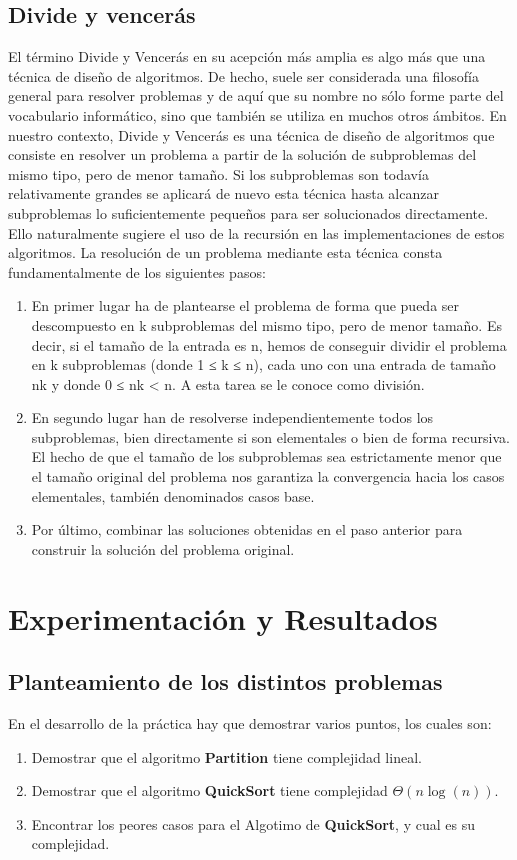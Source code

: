 \documentclass[12pt,twoside]{article}
\begin{document}
\subsection{\textbf{Divide y vencerás}}
\setlength{\parindent}{1.5em}El término Divide y Vencerás en su acepción más amplia es algo más que una técnica de diseño de algoritmos. De hecho, suele ser considerada una filosofía general para resolver problemas y de aquí que su nombre no sólo forme parte del vocabulario informático, sino que también se utiliza en muchos otros ámbitos.
En nuestro contexto, Divide y Vencerás es una técnica de diseño de algoritmos que consiste en resolver un problema a partir de la solución de subproblemas del mismo tipo, pero de menor tamaño. Si los subproblemas son todavía relativamente grandes se aplicará de nuevo esta técnica hasta alcanzar subproblemas lo suficientemente pequeños para ser solucionados directamente. Ello naturalmente sugiere el uso de la recursión en las implementaciones de estos algoritmos.
La resolución de un problema mediante esta técnica consta fundamentalmente de los siguientes pasos:
\begin{enumerate}
  \item En primer lugar ha de plantearse el problema de forma que pueda ser descompuesto en k subproblemas del mismo tipo, pero de menor tamaño. Es decir, si el tamaño de la entrada es n, hemos de conseguir dividir el problema en k subproblemas (donde 1 ≤ k ≤ n), cada uno con una entrada de tamaño nk y donde 0 ≤ nk < n. A esta tarea se le conoce como división.
  \item En segundo lugar han de resolverse independientemente todos los subproblemas, bien directamente si son elementales o bien de forma recursiva. El hecho de que el tamaño de los subproblemas sea estrictamente menor que el tamaño original del problema nos garantiza la convergencia hacia los casos elementales, también denominados casos base.
  \item Por último, combinar las soluciones obtenidas en el paso anterior para construir la solución del problema original.
\end{enumerate}
\centerline{}


\section{Experimentaci\'on y Resultados}
\subsection{\textbf{Planteamiento de los distintos problemas}}
En el desarrollo de la práctica hay que demostrar varios puntos, los cuales son: 
\begin{enumerate}
  \item Demostrar que el algoritmo \textbf{Partition} tiene complejidad lineal.
  \item Demostrar que el algoritmo \textbf{QuickSort} tiene complejidad $\Theta (n \log (n))$.
  \item Encontrar los peores casos para el Algotimo de \textbf{QuickSort}, y cual es su complejidad.
\end{enumerate}
\centerline{}
\end{document}
